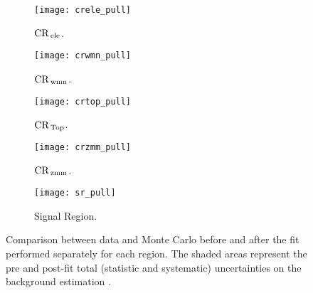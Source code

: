 \begin{figure}[!h]
  \centering
  \begin{subfigure}[t]{.48\linewidth}
    \texttt{[image: crele\_pull]}
    \caption{$\mathrm{CR}_\mathrm{\, ele}$.}
    \label{fig:crele_pull}
  \end{subfigure}
  \begin{subfigure}[t]{.48\linewidth}
    \texttt{[image: crwmn\_pull]}
    \caption{$\mathrm{CR}_\mathrm{\, wmn}$.}
    \label{fig:crwnm_pull}
  \end{subfigure}
  \begin{subfigure}[t]{.48\linewidth}
    \texttt{[image: crtop\_pull]}
    \caption{$\mathrm{CR}_\mathrm{\, Top}$.}
    \label{fig:crtop_pull}
  \end{subfigure}
    \begin{subfigure}[t]{.48\linewidth}
    \texttt{[image: crzmm\_pull]}
    \caption{$\mathrm{CR}_\mathrm{\, zmm}$.}
    \label{fig:crzmm_pull}
  \end{subfigure}
  \begin{subfigure}[t]{.48\linewidth}
    \texttt{[image: sr\_pull]}
    \caption{Signal Region.}
    \label{fig:sr_pull}
  \end{subfigure}
  \caption{Comparison between data and Monte Carlo before and after the fit
    performed separately for each region. The shaded areas represent the pre and
    post-fit total (statistic and systematic) uncertainties on the background
    estimation .}
  \label{fig:region_pulls}
\end{figure}
